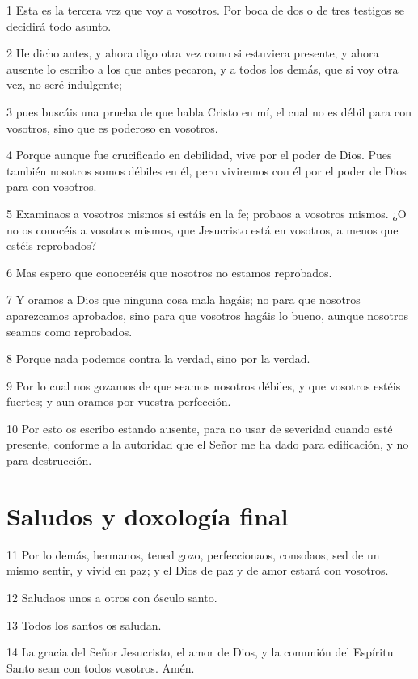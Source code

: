 \par 1 Esta es la tercera vez que voy a vosotros. Por boca de dos o de tres testigos se decidirá todo asunto.
\par 2 He dicho antes, y ahora digo otra vez como si estuviera presente, y ahora ausente lo escribo a los que antes pecaron, y a todos los demás, que si voy otra vez, no seré indulgente;
\par 3 pues buscáis una prueba de que habla Cristo en mí, el cual no es débil para con vosotros, sino que es poderoso en vosotros.
\par 4 Porque aunque fue crucificado en debilidad, vive por el poder de Dios. Pues también nosotros somos débiles en él, pero viviremos con él por el poder de Dios para con vosotros.
\par 5 Examinaos a vosotros mismos si estáis en la fe; probaos a vosotros mismos. ¿O no os conocéis a vosotros mismos, que Jesucristo está en vosotros, a menos que estéis reprobados?
\par 6 Mas espero que conoceréis que nosotros no estamos reprobados.
\par 7 Y oramos a Dios que ninguna cosa mala hagáis; no para que nosotros aparezcamos aprobados, sino para que vosotros hagáis lo bueno, aunque nosotros seamos como reprobados.
\par 8 Porque nada podemos contra la verdad, sino por la verdad.
\par 9 Por lo cual nos gozamos de que seamos nosotros débiles, y que vosotros estéis fuertes; y aun oramos por vuestra perfección.
\par 10 Por esto os escribo estando ausente, para no usar de severidad cuando esté presente, conforme a la autoridad que el Señor me ha dado para edificación, y no para destrucción.

\section*{Saludos y doxología final}

\par 11 Por lo demás, hermanos, tened gozo, perfeccionaos, consolaos, sed de un mismo sentir, y vivid en paz; y el Dios de paz y de amor estará con vosotros.
\par 12 Saludaos unos a otros con ósculo santo.
\par 13 Todos los santos os saludan.
\par 14 La gracia del Señor Jesucristo, el amor de Dios, y la comunión del Espíritu Santo sean con todos vosotros. Amén.

